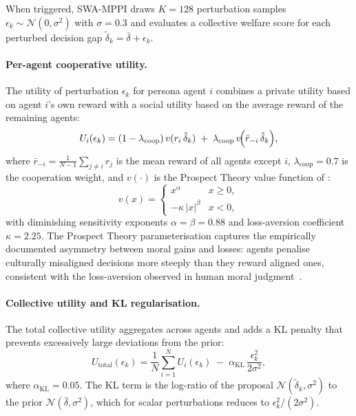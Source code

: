 \documentclass{article}
\begin{document}
When triggered, SWA-MPPI draws $K=128$ perturbation samples
$\epsilon_k \sim \mathcal{N}(0,\sigma^2)$ with $\sigma=0.3$ and evaluates a collective
welfare score for each perturbed decision gap $\tilde{\delta}_k = \bar{\delta} + \epsilon_k$.

\paragraph{Per-agent cooperative utility.}
The utility of perturbation $\epsilon_k$ for persona agent $i$ combines a private utility
based on agent $i$'s own reward with a social utility based on the average reward of the
remaining agents:
\begin{equation}
  U_i(\epsilon_k) = (1 - \lambda_{\text{coop}})\,v(r_i\,\tilde{\delta}_k)
  \;+\; \lambda_{\text{coop}}\,v\!\Bigl(\bar{r}_{-i}\,\tilde{\delta}_k\Bigr),
  \label{eq:util_agent}
\end{equation}
where $\bar{r}_{-i} = \frac{1}{N-1}\sum_{j \neq i} r_j$ is the mean reward of all agents
except $i$, $\lambda_{\text{coop}}=0.7$ is the cooperation weight, and $v(\cdot)$ is the
Prospect Theory value function of \citet{kahneman1979prospect}:
\begin{equation}
  v(x) = \begin{cases}
    x^{\alpha} & x \geq 0,\\
    -\kappa\,|x|^{\beta} & x < 0,
  \end{cases}
  \label{eq:prospect}
\end{equation}
with diminishing sensitivity exponents $\alpha=\beta=0.88$ and loss-aversion coefficient
$\kappa=2.25$. The Prospect Theory parameterisation captures the empirically documented
asymmetry between moral gains and losses: agents penalise culturally misaligned decisions
more steeply than they reward aligned ones, consistent with the loss-aversion observed in
human moral judgment~\citep{kleiman2017learning}.

\paragraph{Collective utility and KL regularisation.}
The total collective utility aggregates across agents and adds a KL penalty that prevents
excessively large deviations from the prior:
\begin{equation}
  U_{\text{total}}(\epsilon_k)
  = \frac{1}{N}\sum_{i=1}^{N} U_i(\epsilon_k)
  \;-\; \alpha_{\text{KL}}\,\frac{\epsilon_k^2}{2\sigma^2},
  \label{eq:util_total}
\end{equation}
where $\alpha_{\text{KL}}=0.05$. The KL term is the log-ratio of the proposal
$\mathcal{N}(\tilde{\delta}_k, \sigma^2)$ to the prior $\mathcal{N}(\bar{\delta}, \sigma^2)$,
which for scalar perturbations reduces to $\epsilon_k^2/(2\sigma^2)$.
\end{document}
